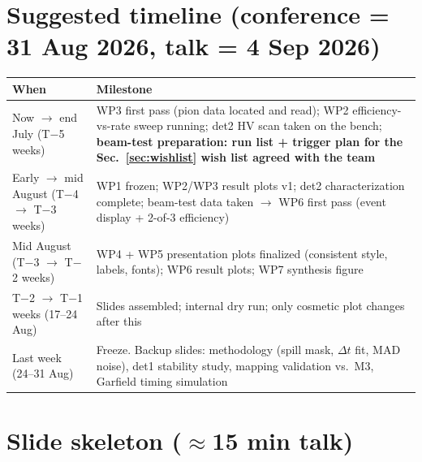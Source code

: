 \documentclass[11pt,a4paper]{article}
\begin{document}
\section{Suggested timeline (conference = 31 Aug 2026, talk = 4 Sep 2026)}

\begin{table}[h!]
\centering\small
\begin{tabular}{L{3.6cm} L{11.6cm}}
\toprule
\textbf{When} & \textbf{Milestone} \\
\midrule
Now $\rightarrow$ end July (T$-$5 weeks) &
  WP3 first pass (pion data located and read); WP2 efficiency-vs-rate sweep
  running; det2 HV scan taken on the bench; \textbf{beam-test preparation:
  run list + trigger plan for the Sec.~\ref{sec:wishlist} wish list agreed
  with the team} \\
\addlinespace
Early $\rightarrow$ mid August (T$-$4 $\rightarrow$ T$-$3 weeks) &
  WP1 frozen; WP2/WP3 result plots v1; det2 characterization complete;
  beam-test data taken $\rightarrow$ WP6 first pass (event display + 2-of-3
  efficiency) \\
\addlinespace
Mid August (T$-$3 $\rightarrow$ T$-$2 weeks) &
  WP4 + WP5 presentation plots finalized (consistent style, labels, fonts);
  WP6 result plots; WP7 synthesis figure \\
\addlinespace
T$-$2 $\rightarrow$ T$-$1 weeks (17--24 Aug) &
  Slides assembled; internal dry run; only cosmetic plot changes after this \\
\addlinespace
Last week (24--31 Aug) &
  Freeze. Backup slides: methodology (spill mask, $\Delta t$ fit, MAD noise),
  det1 stability study, mapping validation vs.\ M3, Garfield timing
  simulation \\
\bottomrule
\end{tabular}
\end{table}

\section{Slide skeleton (\texorpdfstring{$\approx$}{~}15 min talk)}
\end{document}
